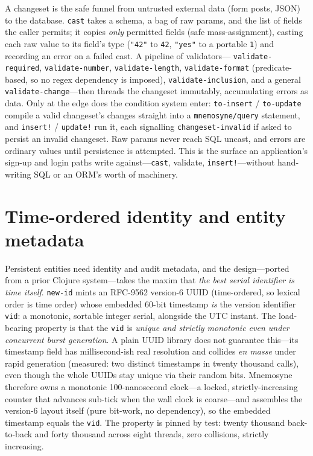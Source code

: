\documentclass[11pt,a4paper]{article}
\begin{document}
A changeset is the safe funnel from untrusted external data (form posts, JSON) to the
database. \texttt{cast} takes a schema, a bag of raw params, and the list of fields the
caller permits; it copies \emph{only} permitted fields (safe mass-assignment), casting each
raw value to its field's type (\texttt{"42"} to \texttt{42}, \texttt{"yes"} to a portable
\texttt{1}) and recording an error on a failed cast. A pipeline of validators---
\texttt{validate-required}, \texttt{validate-number}, \texttt{validate-length},
\texttt{validate-format} (predicate-based, so no regex dependency is imposed),
\texttt{validate-inclusion}, and a general \texttt{validate-change}---then threads the
changeset immutably, accumulating errors as data. Only at the edge does the condition system
enter: \texttt{to-insert} / \texttt{to-update} compile a valid changeset's changes straight
into a \texttt{mnemosyne/query} statement, and \texttt{insert!} / \texttt{update!} run it,
each signalling \texttt{changeset-invalid} if asked to persist an invalid changeset. Raw
params never reach SQL uncast, and errors are ordinary values until persistence is attempted.
This is the surface an application's sign-up and login paths write against---\texttt{cast},
validate, \texttt{insert!}---without hand-writing SQL or an ORM's worth of machinery.

\section{Time-ordered identity and entity metadata}
\label{sec:identity}
Persistent entities need identity and audit metadata, and the design---ported from a prior
Clojure system---takes the maxim that \emph{the best serial identifier is time itself}.
\texttt{new-id} mints an RFC-9562 version-6 UUID (time-ordered, so lexical order is time
order) whose embedded 60-bit timestamp \emph{is} the version identifier \texttt{vid}: a
monotonic, sortable integer serial, alongside the UTC instant. The load-bearing property is
that the \texttt{vid} is \emph{unique and strictly monotonic even under concurrent burst
generation}. A plain UUID library does not guarantee this---its timestamp field has
millisecond-ish real resolution and collides \emph{en masse} under rapid generation (measured:
two distinct timestamps in twenty thousand calls), even though the whole UUIDs stay unique via
their random bits. Mnemosyne therefore owns a monotonic 100-nanosecond clock---a locked,
strictly-increasing counter that advances sub-tick when the wall clock is coarse---and
assembles the version-6 layout itself (pure bit-work, no dependency), so the embedded
timestamp equals the \texttt{vid}. The property is pinned by test: twenty thousand
back-to-back and forty thousand across eight threads, zero collisions, strictly increasing.
\end{document}
